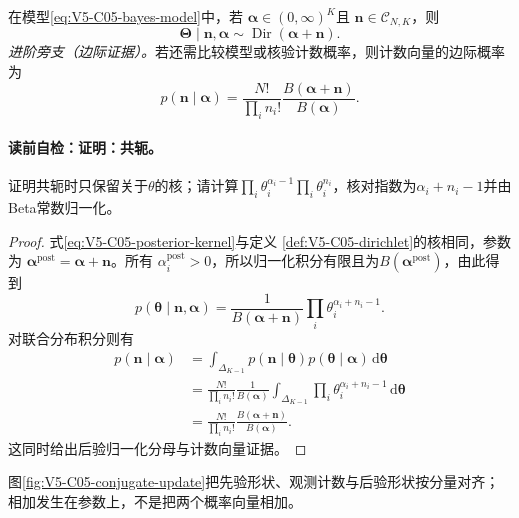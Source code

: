 \begin{theorem}[\DirichletMultinomial{}共轭]\label{thm:V5-C05-conjugacy}
在模型\eqref{eq:V5-C05-bayes-model}中，若
$\boldsymbol\alpha\in(0,\infty)^K$且
$\boldsymbol n\in\mathcal C_{N,K}$，则
\begin{equation}\label{eq:V5-C05-conjugate-posterior}
\boldsymbol\Theta\mid\boldsymbol n,\boldsymbol\alpha
\sim\operatorname{Dir}(\boldsymbol\alpha+\boldsymbol n).
\end{equation}
\emph{进阶旁支（边际证据）。}若还需比较模型或核验计数概率，则计数向量的边际概率为
\begin{equation}\label{eq:V5-C05-dirichlet-multinomial}
p(\boldsymbol n\mid\boldsymbol\alpha)
=\frac{N!}{\prod_i n_i!}
\frac{B(\boldsymbol\alpha+\boldsymbol n)}
{B(\boldsymbol\alpha)}.
\end{equation}
\end{theorem}
\paragraph{读前自检：证明：共轭。}证明共轭时只保留关于$\theta$的核；请计算$\prod_i\theta_i^{\alpha_i-1}\prod_i\theta_i^{n_i}$，核对指数为$\alpha_i+n_i-1$并由Beta常数归一化。\par

\begin{proof}
式\eqref{eq:V5-C05-posterior-kernel}与定义
\ref{def:V5-C05-dirichlet}的核相同，参数为
$\boldsymbol\alpha^{\mathrm{post}}=\boldsymbol\alpha+\boldsymbol n$。所有
$\alpha_i^{\mathrm{post}}>0$，所以归一化积分有限且为$B(\boldsymbol\alpha^{\mathrm{post}})$，由此得到
\[
p(\boldsymbol\theta\mid\boldsymbol n,\boldsymbol\alpha)
=\frac1{B(\boldsymbol\alpha+\boldsymbol n)}
\prod_i\theta_i^{\alpha_i+n_i-1}.
\]
对联合分布积分则有
\begin{align*}
p(\boldsymbol n\mid\boldsymbol\alpha)
&=\int_{\Delta_{K-1}}
p(\boldsymbol n\mid\boldsymbol\theta)
p(\boldsymbol\theta\mid\boldsymbol\alpha)
\,\mathrm d\boldsymbol\theta\\
&=\frac{N!}{\prod_i n_i!}
\frac1{B(\boldsymbol\alpha)}
\int_{\Delta_{K-1}}\prod_i
\theta_i^{\alpha_i+n_i-1}\,\mathrm d\boldsymbol\theta\\
&=\frac{N!}{\prod_i n_i!}
\frac{B(\boldsymbol\alpha+\boldsymbol n)}
{B(\boldsymbol\alpha)}.
\end{align*}
这同时给出后验归一化分母与计数向量证据。
\end{proof}

图\ref{fig:V5-C05-conjugate-update}把先验形状、观测计数与后验形状按分量对齐；相加发生在参数上，不是把两个概率向量相加。
